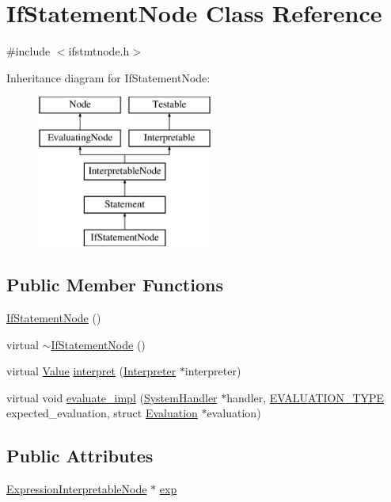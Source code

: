 \hypertarget{classIfStatementNode}{}\section{If\+Statement\+Node Class Reference}
\label{classIfStatementNode}


{\ttfamily \#include $<$ifstmtnode.\+h$>$}

Inheritance diagram for If\+Statement\+Node\+:\begin{figure}[H]
\begin{center}
\leavevmode
\includegraphics[height=5.000000cm]{classIfStatementNode}
\end{center}
\end{figure}
\subsection*{Public Member Functions}
\begin{DoxyCompactItemize}
\item 
\hyperlink{classIfStatementNode_a99188e8333e6d12e816bd5ba319a7da8}{If\+Statement\+Node} ()
\item 
virtual \hyperlink{classIfStatementNode_a81885b8c46c006ff58324e9121e0bab2}{$\sim$\+If\+Statement\+Node} ()
\item 
virtual \hyperlink{classValue}{Value} \hyperlink{classIfStatementNode_aef627f32330e55f8bb9e5ac2f2f5f3f8}{interpret} (\hyperlink{classInterpreter}{Interpreter} $\ast$interpreter)
\item 
virtual void \hyperlink{classIfStatementNode_a725287a819ddcdc914cf774da80272e4}{evaluate\+\_\+impl} (\hyperlink{classSystemHandler}{System\+Handler} $\ast$handler, \hyperlink{statics_8h_a6664c451ca7787483a7981cc1de68dbb}{E\+V\+A\+L\+U\+A\+T\+I\+O\+N\+\_\+\+T\+Y\+PE} expected\+\_\+evaluation, struct \hyperlink{structEvaluation}{Evaluation} $\ast$evaluation)
\end{DoxyCompactItemize}
\subsection*{Public Attributes}
\begin{DoxyCompactItemize}
\item 
\hyperlink{classExpressionInterpretableNode}{Expression\+Interpretable\+Node} $\ast$ \hyperlink{classIfStatementNode_a021cd8dd0edd333f98d74cfd1c38acd0}{exp}
\end{DoxyCompactItemize}
